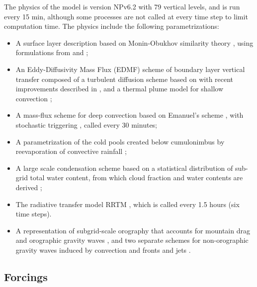 The physics of the model is version NPv6.2 with 79 vertical levels, and is run every 15 min, although some processes are not called at every time step to limit computation time.
The physics include the following parametrizations:
\begin{itemize}
    \item A surface layer description based on Monin-Obukhov similarity theory \citep{monin1954osnovnye}, using formulations from \cite{louis_parametric_1979} and \cite{king_sensitivity_2001}; 
    \item An Eddy-Diffusivity Mass Flux (EDMF) scheme of boundary layer vertical transfer composed of a turbulent diffusion scheme based on \cite{yamada_simulations_1983} with recent improvements described in \cite{vignon_modeling_2018}, and a thermal plume model for shallow convection \citep{rio_thermal_2008, hourdin_unified_2019}; 
    \item A mass-flux scheme for deep convection based on Emanuel's scheme \citep{emanuel_scheme_1991, grandpeix_improved_2004, rio_control_2013}, with stochastic triggering \citep{rochetin_deep_2014, rochetin_deep_2014-1}, called every 30 minutes; 
    \item A parametrization of the cold pools created below cumulonimbus by reevaporation of convective rainfall \citep{grandpeix_density_2010-1,grandpeix_density_2010};
    \item A large scale condensation scheme based on a statistical distribution of sub-grid total water content, from which cloud fraction and water contents are derived \citep{madeleine_improved_2020}; 
    \item The radiative transfer model RRTM \citep{mlawer_radiative_1997}, which is called every 1.5 hours (six time steps).
    \item A representation of subgrid-scale orography that accounts for mountain drag and orographic gravity waves \citep{lott_new_1997,lott_alleviation_1999}, and two separate schemes for non-orographic gravity waves induced by convection \citep{lott_stochastic_2013} and fronts and jets \citep{de_la_camara_parameterization_2015}.
\end{itemize}

\subsection{Forcings}

